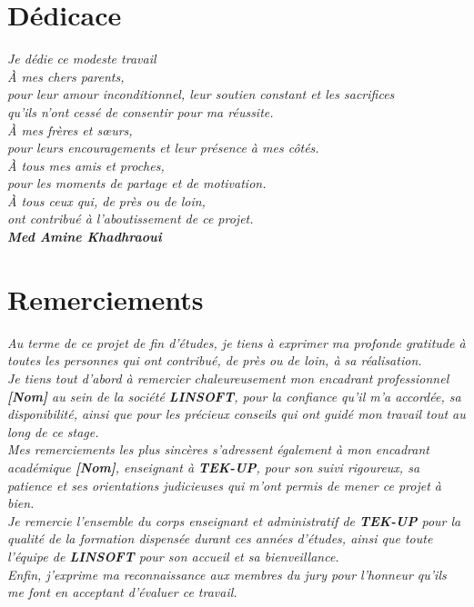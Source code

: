 \documentclass[12pt,a4paper,oneside]{report}
\begin{document}
\chapter*{Dédicace}
\thispagestyle{empty}
\begin{center}\itshape\large
\vspace{1cm}
Je dédie ce modeste travail\\[0.6cm]
À mes chers parents,\\
pour leur amour inconditionnel, leur soutien constant et les sacrifices\\
qu'ils n'ont cessé de consentir pour ma réussite.\\[0.8cm]
À mes frères et sœurs,\\
pour leurs encouragements et leur présence à mes côtés.\\[0.8cm]
À tous mes amis et proches,\\
pour les moments de partage et de motivation.\\[0.8cm]
À tous ceux qui, de près ou de loin,\\
ont contribué à l'aboutissement de ce projet.\\[1cm]
\upshape\normalsize
\textbf{Med Amine Khadhraoui}
\end{center}
\clearpage

\chapter*{Remerciements}
\thispagestyle{empty}
\itshape
\noindent Au terme de ce projet de fin d'études, je tiens à exprimer ma profonde gratitude
à toutes les personnes qui ont contribué, de près ou de loin, à sa réalisation.
\\[0.4cm]
Je tiens tout d'abord à remercier chaleureusement mon encadrant professionnel
\textbf{[Nom]} au sein de la société \textbf{LINSOFT}, pour la confiance qu'il m'a accordée,
sa disponibilité, ainsi que pour les précieux conseils qui ont guidé mon travail tout au
long de ce stage.
\\[0.4cm]
Mes remerciements les plus sincères s'adressent également à mon encadrant académique
\textbf{[Nom]}, enseignant à \textbf{TEK-UP}, pour son suivi rigoureux, sa patience et ses
orientations judicieuses qui m'ont permis de mener ce projet à bien.
\\[0.4cm]
Je remercie l'ensemble du corps enseignant et administratif de \textbf{TEK-UP} pour la
qualité de la formation dispensée durant ces années d'études, ainsi que toute l'équipe de
\textbf{LINSOFT} pour son accueil et sa bienveillance.
\\[0.4cm]
Enfin, j'exprime ma reconnaissance aux membres du jury pour l'honneur qu'ils me font en
acceptant d'évaluer ce travail.
\\[0.6cm]
\upshape
\clearpage
\end{document}
